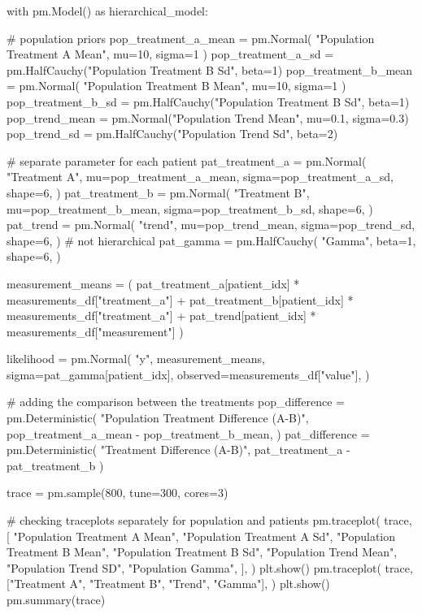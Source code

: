 \documentclass[12pt,a4paper,leqno]{report}
\theoremstyle{plain}
\theoremstyle{definition}
\theoremstyle{remark}
\begin{document}
\bigskip
\begin{pyverbatim}[][fontsize=\footnotesize]

with pm.Model() as hierarchical_model:

    # population priors
    pop_treatment_a_mean = pm.Normal(
        "Population Treatment A Mean", mu=10, sigma=1
    )
    pop_treatment_a_sd = pm.HalfCauchy("Population Treatment B Sd", beta=1)
    pop_treatment_b_mean = pm.Normal(
        "Population Treatment B Mean", mu=10, sigma=1
    )
    pop_treatment_b_sd = pm.HalfCauchy("Population Treatment B Sd", beta=1)
    pop_trend_mean = pm.Normal("Population Trend Mean", mu=0.1, sigma=0.3)
    pop_trend_sd = pm.HalfCauchy("Population Trend Sd", beta=2)

    # separate parameter for each patient
    pat_treatment_a = pm.Normal(
        "Treatment A",
        mu=pop_treatment_a_mean,
        sigma=pop_treatment_a_sd,
        shape=6,
    )
    pat_treatment_b = pm.Normal(
        "Treatment B",
        mu=pop_treatment_b_mean,
        sigma=pop_treatment_b_sd,
        shape=6,
    )
    pat_trend = pm.Normal(
        "trend",
        mu=pop_trend_mean,
        sigma=pop_trend_sd,
        shape=6,
    )
    # not hierarchical
    pat_gamma = pm.HalfCauchy(
        "Gamma", beta=1, shape=6,
    )

    measurement_means = (
        pat_treatment_a[patient_idx] * measurements_df["treatment_a"]
        + pat_treatment_b[patient_idx] * measurements_df["treatment_a"]
        + pat_trend[patient_idx] * measurements_df["measurement"]
    )

    likelihood = pm.Normal(
        "y",
        measurement_means,
        sigma=pat_gamma[patient_idx],
        observed=measurements_df["value"],
    )

    # adding the comparison between the treatments
    pop_difference = pm.Deterministic(
        "Population Treatment Difference (A-B)",
        pop_treatment_a_mean - pop_treatment_b_mean,
    )
    pat_difference = pm.Deterministic(
        "Treatment Difference (A-B)", pat_treatment_a - pat_treatment_b
    )

    trace = pm.sample(800, tune=300, cores=3)

    # checking traceplots separately for population and patients
    pm.traceplot(
        trace,
        [
            "Population Treatment A Mean",
            "Population Treatment A Sd",
            "Population Treatment B Mean",
            "Population Treatment B Sd",
            "Population Trend Mean",
            "Population Trend SD",
            "Population Gamma",
        ],
    )
    plt.show()
    pm.traceplot(
        trace, ["Treatment A", "Treatment B", "Trend", "Gamma"],
    )
    plt.show()
    pm.summary(trace)


\end{pyverbatim}
\end{document}
